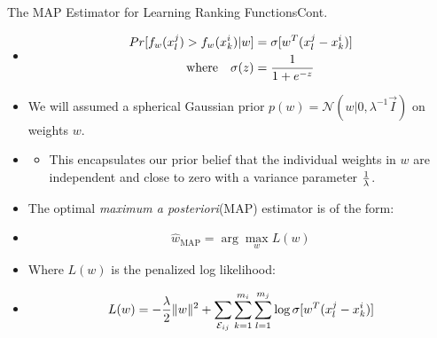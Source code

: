 \documentclass[8pt]{beamer}
\renewcommand{\|}[1][.3em]{\hspace{#1}|\hspace{#1}}
\renewcommand{\,}[1][.3em]{,\hspace{#1}}
\newlength{\wideitemsep}
\let\olditem\item
\renewcommand{\item}{\setlength{\itemsep}{\wideitemsep}\olditem}
\newcommand{\m}[1]{\mathcal{#1}}
\newcommand{\e}[1]{{\emph{#1}}}
\renewcommand{\,}{,\hspace{3pt}}
\renewcommand{\|}{\hspace{3pt}|\hspace{3pt}}
\newcommand{\argmax}{\arg\!\max}
\begin{document}
\begin{frame}{The MAP Estimator for Learning Ranking Functions}{Cont.}
    \begin{itemize}
    \item[] \begin{align}
        Pr[f_w(x_l^j) > f_w(x_k^i) | w] &= \sigma[w^T(x_l^j - x_k^i)]\\
        \text{where\hspace{1em}} \sigma(z) &= {1 \over {1 + e^{-z}}}\nonumber
    \end{align}
    \item We will assumed a spherical Gaussian prior $p(w) = \m{N}(w|0, \lambda^{-1}\vec{I})$ on weights $w$.
    \item[] \begin{itemize}
        \item This encapsulates our prior belief that the individual weights in $w$ are independent and close to zero with a variance parameter $1 \over \lambda$.
    \end{itemize}
    \item The optimal \e{maximum a posteriori}(MAP) estimator is of the form:
    \item[] \begin{equation}
    \hat{w}_{\text{MAP}} = \argmax_{w} L(w)
    \end{equation}
    \item Where $L(w)$ is the penalized log likelihood:
    \item[] \begin{equation}
        L(w) = -{\lambda \over 2}\lVert w \rVert^2 + \sum_{\m{E}_{ij}}\sum_{k = 1}^{m_i}\sum_{l = 1}^{m_j} \log\sigma[w^T(x_l^j - x_k^i)]
        \label{eq:log_likelihood_L_w}
    \end{equation}
    \end{itemize}
\end{frame}
\end{document}
